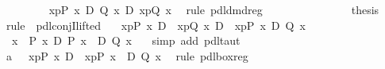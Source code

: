 \begin{isabellebody}
\ \ \ \ \ \ \isamarkupfalse%
\ {\isachardoublequote}{\isasymturnstile}\ {\isasymlangle}x{\isasymleftarrow}p{\isasymrangle}{\isacharparenleft}P\ x\ {\isasymand}\isactrlsub D\ Q\ x{\isacharparenright}\ {\isasymlongrightarrow}\isactrlsub D\ {\isasymlangle}x{\isasymleftarrow}p{\isasymrangle}{\isacharparenleft}Q\ x{\isacharparenright}{\isachardoublequote}\ \isamarkupfalse%
\ {\isacharparenleft}rule\ pdl{\isacharunderscore}dmd{\isacharunderscore}reg{\isacharparenright}\isanewline
\ \ \ \ \isamarkupfalse%
\isanewline
\ \ \isamarkupfalse%
\isanewline
\ \ %
\isanewline
\ \ \isamarkupfalse%
\ \isamarkupfalse%
\ {\isacharquery}thesis\ \isamarkupfalse%
\ {\isacharparenleft}rule\ \ pdl{\isacharunderscore}conjI{\isacharunderscore}lifted{\isacharparenright}\isanewline
\isamarkupfalse%
\isanewline
\isanewline
\isamarkupfalse%
\ {\isachardoublequote}{\isasymturnstile}\ {\isacharbrackleft}{\isacharhash}\ x{\isasymleftarrow}p{\isacharbrackright}{\isacharparenleft}P\ x{\isacharparenright}\ {\isasymor}\isactrlsub D\ {\isacharbrackleft}{\isacharhash}\ x{\isasymleftarrow}p{\isacharbrackright}{\isacharparenleft}Q\ x{\isacharparenright}\ {\isasymlongrightarrow}\isactrlsub D\ {\isacharbrackleft}{\isacharhash}\ x{\isasymleftarrow}p{\isacharbrackright}{\isacharparenleft}P\ x\ {\isasymor}\isactrlsub D\ Q\ x{\isacharparenright}{\isachardoublequote}\isanewline
\isamarkupfalse%
\ {\isacharminus}\isanewline
\ \ \isamarkupfalse%
\ {\isachardoublequote}\ {\isasymforall}x{\isachardot}\ {\isasymturnstile}\ P\ x\ {\isasymlongrightarrow}\isactrlsub D\ P\ x\ \ {\isasymor}\isactrlsub D\ Q\ x{\isachardoublequote}\ \ \isamarkupfalse%
\ {\isacharparenleft}simp\ add{\isacharcolon}\ pdl{\isacharunderscore}taut{\isacharparenright}\isanewline
\ \ \isamarkupfalse%
\ a{}{\isacharcolon}\ {\isachardoublequote}{\isasymturnstile}\ {\isacharbrackleft}{\isacharhash}\ x{\isasymleftarrow}p{\isacharbrackright}{\isacharparenleft}P\ x{\isacharparenright}\ {\isasymlongrightarrow}\isactrlsub D\ {\isacharbrackleft}{\isacharhash}\ x{\isasymleftarrow}p{\isacharbrackright}{\isacharparenleft}P\ x\ \ {\isasymor}\isactrlsub D\ Q\ x{\isacharparenright}{\isachardoublequote}\ \isamarkupfalse%
\ {\isacharparenleft}rule\ pdl{\isacharunderscore}box{\isacharunderscore}reg{\isacharparenright}\isanewline
\ \ \isamarkupfalse%

\end{isabellebody}
